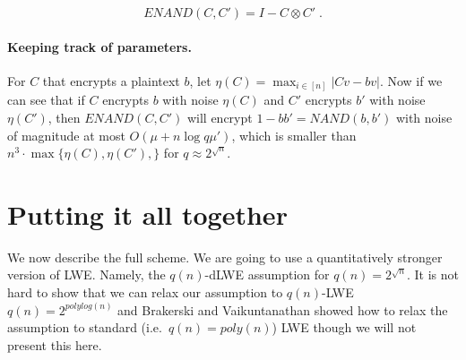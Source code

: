 \begin{equation*}
\ensuremath{\mathit{ENAND}}(C,C') = I - C \otimes C' \;.
\end{equation*}

\paragraph{Keeping track of parameters.} For \(C\) that encrypts a
plaintext \(b\), let \(\eta(C) = \max_{i\in [n]} |Cv -bv|\). Now if we
can see that if \(C\) encrypts \(b\) with noise \(\eta(C)\) and \(C'\)
encrypts \(b'\) with noise \(\eta(C')\), then
\(\ensuremath{\mathit{ENAND}}(C,C')\) will encrypt
\(1-bb' = \ensuremath{\mathit{NAND}}(b,b')\) with noise of magnitude at
most \(O(\mu + n\log q \mu')\), which is smaller than
\(n^3\cdot \max\{\eta(C),\eta(C'),\}\) for \(q\approx 2^{\sqrt{n}}\).

\section{Putting it all together}\label{15-Putting-it-all-togethe}

We now describe the full scheme. We are going to use a quantitatively
stronger version of LWE. Namely, the \(q(n)\)-dLWE assumption for
\(q(n)=2^{\sqrt{n}}\). It is not hard to show that we can relax our
assumption to \(q(n)\)-LWE \(q(n)=2^{polylog(n)}\) and Brakerski and
Vaikuntanathan showed how to relax the assumption to standard
(i.e.~\(q(n)=poly(n)\)) LWE though we will not present this here.

